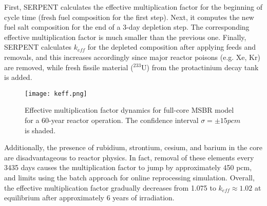 First, SERPENT calculates the effective multiplication factor for the beginning of cycle time (fresh fuel composition for the first step). Next, it computes the new fuel salt composition for the end of a 3-day depletion step. The corresponding effective multiplication factor is much smaller than the previous one. Finally, SERPENT calculates $k_{eff}$ for the depleted composition after applying feeds and removals, and this increases accordingly since major reactor poisons (e.g. Xe, Kr) are removed, while fresh fissile material ($^{233}$U) from the protactinium decay tank is added. 
\begin{figure}[ht!] %
  \centering
  \texttt{[image: keff.png]}
  \caption{Effective multiplication factor dynamics for full-core \gls{MSBR} model for a 60-year reactor operation. The confidence interval $\sigma=\pm15pcm$ is shaded.}
  \label{fig:keff}
\end{figure}
Additionally, the presence of rubidium, strontium, cesium, and barium in the core are disadvantageous to reactor physics. In fact, removal of these elements every 3435 days causes the multiplication factor to jump by approximately 450 pcm, and limits using the batch approach for online reprocessing simulation. Overall, the effective multiplication factor gradually decreases from 1.075 to $k_{eff} \approx 1.02$ at equilibrium after approximately 6 years of irradiation. 

